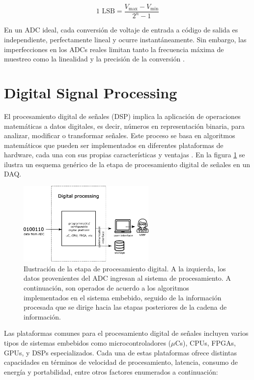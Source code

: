 \documentclass[]{book}
\begin{document}
\begin{equation}
    1 \text{ LSB} = \frac{V_{\text{max}} - V_{\text{min}}}{2^n - 1}
\end{equation}

\noindent En un ADC ideal, cada conversión de voltaje de entrada a código de salida es independiente, perfectamente lineal y ocurre instantáneamente. Sin embargo, las imperfecciones en los ADCs reales limitan tanto la frecuencia máxima de muestreo como la linealidad y la precisión de la conversión \cite{kolanoski2020particle}.


\section{Digital Signal Processing}
\label{sec:digital_processing}

\noindent El procesamiento digital de señales (DSP) implica la aplicación de operaciones matemáticas a datos digitales, es decir, números en representación binaria, para analizar, modificar o transformar señales. Este proceso se basa en algoritmos matemáticos que pueden ser implementados en diferentes plataformas de hardware, cada una con sus propias características y ventajas \cite{proakis2007digital}. En la figura \ref{fig:digital_stage} se ilustra un esquema genérico de la etapa de procesamiento digital de señales en un DAQ.

\begin{figure}[h]
    \centering
    \includegraphics[width=0.6\textwidth]{digital_stage.png}
    \caption{Ilustración de la etapa de procesamiento digital. A la izquierda, los datos provenientes del ADC ingresan al sistema de procesamiento. A continuación, son operados de acuerdo a los algoritmos implementados en el sistema embebido, seguido de la información procesada que se dirige hacia las etapas posteriores de la cadena de información.}
    \label{fig:digital_stage}

\end{figure}


\noindent Las plataformas comunes para el procesamiento digital de señales incluyen varios tipos de sistemas embebidos como microcontroladores ($\mu$Cs), CPUs, FPGAs, GPUs, y DSPs especializados. Cada una de estas plataformas ofrece distintas capacidades en términos de velocidad de procesamiento, latencia, consumo de energía y portabilidad, entre otros factores enumerados a continuación\cite{meyer2007digital}:
\end{document}
